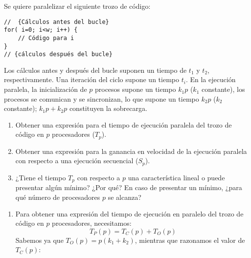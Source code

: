 \begin{ejercicio}
    Se quiere paralelizar el siguiente trozo de código:
    \begin{verbatim}
//  {Cálculos antes del bucle}
for( i=0; i<w; i++) {
    // Código para i
}
// {cálculos después del bucle}
    \end{verbatim}
    Los cálculos antes y después del bucle suponen un tiempo de $t_1$ y $t_2$, respectivamente.
    Una iteración del ciclo supone un tiempo $t_i$. En la ejecución paralela, la inicialización de $p$ procesos supone un tiempo
    $k_1p$ ($k_1$ constante), los procesos se comunican y se sincronizan, lo que supone un tiempo $k_2p$ ($k_2$ constante); $k_1p+k_2p$
    constituyen la sobrecarga.
    \begin{enumerate}
        \item Obtener una expresión para el tiempo de ejecución paralela del trozo de código en $p$ procesadores ($T_p$).
        \item Obtener una expresión para la ganancia en velocidad de la ejecución paralela con respecto a una ejecución secuencial ($S_p$).
        \item ¿Tiene el tiempo $T_p$ con respecto a $p$ una característica lineal o puede presentar algún mínimo? ¿Por qué? En caso de presentar un mínimo, ¿para qué número de procesadores $p$ se alcanza?
    \end{enumerate}

    \begin{enumerate}
        \item Para obtener una expresión del tiempo de ejecución en paralelo del trozo de código en $p$ procesadores, necesitamos:
            \begin{equation*}
                T_P(p) = T_C(p) + T_O(p)
            \end{equation*}
            Sabemos ya que $T_O(p) = p(k_1 + k_2)$, mientras que razonamos el valor de $T_C(p)$:


\end{enumerate}
\end{ejercicio}
